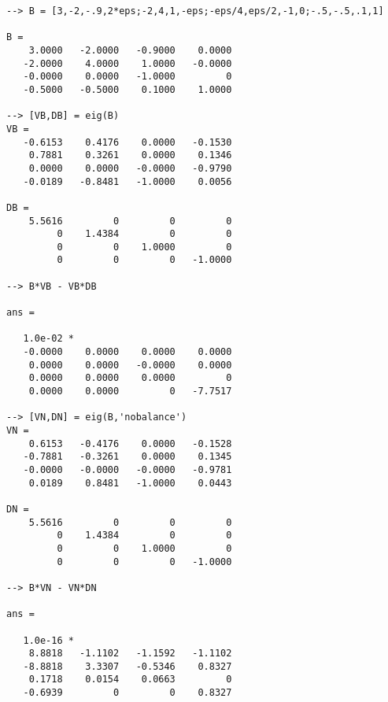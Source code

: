 \begin{verbatim}
--> B = [3,-2,-.9,2*eps;-2,4,1,-eps;-eps/4,eps/2,-1,0;-.5,-.5,.1,1]

B = 
    3.0000   -2.0000   -0.9000    0.0000 
   -2.0000    4.0000    1.0000   -0.0000 
   -0.0000    0.0000   -1.0000         0 
   -0.5000   -0.5000    0.1000    1.0000 

--> [VB,DB] = eig(B)
VB = 
   -0.6153    0.4176    0.0000   -0.1530 
    0.7881    0.3261    0.0000    0.1346 
    0.0000    0.0000   -0.0000   -0.9790 
   -0.0189   -0.8481   -1.0000    0.0056 

DB = 
    5.5616         0         0         0 
         0    1.4384         0         0 
         0         0    1.0000         0 
         0         0         0   -1.0000 

--> B*VB - VB*DB

ans = 

   1.0e-02 * 
   -0.0000    0.0000    0.0000    0.0000 
    0.0000    0.0000   -0.0000    0.0000 
    0.0000    0.0000    0.0000         0 
    0.0000    0.0000         0   -7.7517 

--> [VN,DN] = eig(B,'nobalance')
VN = 
    0.6153   -0.4176    0.0000   -0.1528 
   -0.7881   -0.3261    0.0000    0.1345 
   -0.0000   -0.0000   -0.0000   -0.9781 
    0.0189    0.8481   -1.0000    0.0443 

DN = 
    5.5616         0         0         0 
         0    1.4384         0         0 
         0         0    1.0000         0 
         0         0         0   -1.0000 

--> B*VN - VN*DN

ans = 

   1.0e-16 * 
    8.8818   -1.1102   -1.1592   -1.1102 
   -8.8818    3.3307   -0.5346    0.8327 
    0.1718    0.0154    0.0663         0 
   -0.6939         0         0    0.8327 
\end{verbatim}
